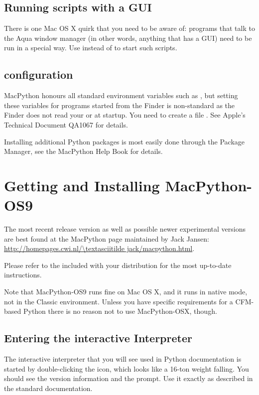 \subsection{Running scripts with a GUI \label{osx-gui-scripts}}

There is one Mac OS X quirk that you need to be aware of: programs
that talk to the Aqua window manager (in other words, anything that has a GUI)
need to be run in a special way. Use  instead of 
to start such scripts.

\subsection{configuration}

MacPython honours all standard \UNIX{} environment variables such as
, but setting these variables for programs started
from the Finder is non-standard
as the Finder does not read your  or  at startup.
You need to create a file .
See Apple's Technical Document QA1067 for details.

Installing additional Python packages is most easily done through the
Package Manager, see the MacPython Help Book for details.

\section{Getting and Installing MacPython-OS9 \label{getting}}

The most recent release version as well as possible newer experimental
versions are best found at the MacPython page maintained by Jack
Jansen: \url{http://homepages.cwi.nl/\textasciitilde jack/macpython.html}.

Please refer to the  included with your distribution for
the most up-to-date instructions.

Note that MacPython-OS9 runs fine on Mac OS X, and it runs in native
mode, not in the Classic environment. Unless you have specific
requirements for a CFM-based Python there is no reason not to
use MacPython-OSX, though.


\subsection{Entering the interactive Interpreter
         \label{interpreter}}

The interactive interpreter that you will see used in Python
documentation is started by double-clicking the
 icon, which looks like a 16-ton weight
falling. You should see the version information and the
\samp{>\code{>}>~} prompt.  Use it exactly as described in the
standard documentation.


